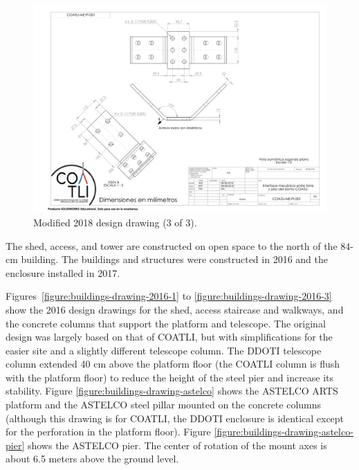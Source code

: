 \begin{figure}
\begin{center}
\includegraphics[height=0.95\linewidth,angle=90]{figures/buildings-coatli-drawing-2018-3.pdf}
\end{center}
\caption{{\projectname} Modified 2018 design drawing (3 of 3).}
\label{figure:buildings-drawing-2018-3}
\end{figure}
\fi

\ifddotioan

The shed, access, and tower are constructed on open space to the north of the 84-cm building. The buildings and structures were constructed in 2016 and the enclosure installed in 2017.

Figures~\ref{figure:buildings-drawing-2016-1} to \ref{figure:buildings-drawing-2016-3} show the 2016 design drawings for the shed, access staircase and walkways, and the concrete columns that support the platform and telescope. The original design was largely based on that of COATLI, but with simplifications for the easier site and a slightly different telescope column. The DDOTI telescope column extended 40 cm above the platform floor (the COATLI column is flush with the platform floor) to reduce the height of the steel pier and increase its stability. Figure  \ref{figure:buildings-drawing-astelco} shows the ASTELCO ARTS platform and the ASTELCO steel pillar mounted on the concrete columns (although this drawing is for COATLI, the DDOTI enclosure is identical except for the perforation in the platform floor). Figure  \ref{figure:buildings-drawing-astelco-pier} shows the ASTELCO pier. The center of rotation of the mount axes is about 6.5 meters above the ground level.

